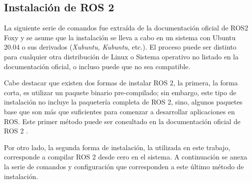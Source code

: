 \subsection{Instalación de ROS 2}
La siguiente serie de comandos fue extraída de la documentación oficial de ROS2 Foxy\cite{ros2} y se asume que la instalación se lleva a cabo en un sistema con Ubuntu 20.04 o sus derivados (\textit{Xubuntu, Kubuntu}, etc.). El proceso puede ser distinto para cualquier otra distribución de Linux o Sistema operativo no listado en la documentación oficial, o incluso puede que no sea compatible.

Cabe destacar que existen dos formas de instalar ROS 2, la primera, la forma corta, es utilizar un paquete binario pre-compilado; sin embargo, este tipo de instalación no incluye la paquetería completa de ROS 2, sino, algunos paquetes base que son más que suficientes para comenzar a desarrollar aplicaciones en ROS. Este primer método puede ser consultado en la documentación oficial de ROS 2 \cite{ROS2Ubuntu}.

Por otro lado, la segunda forma de instalación, la utilizada en este trabajo, corresponde a compilar ROS 2 desde cero en el sistema. A continuación se anexa la serie de comandos y configuración que corresponden a este último método de instalación.


